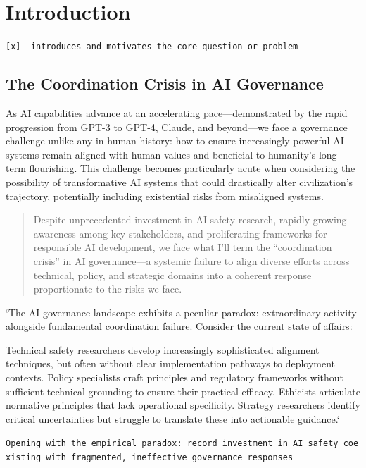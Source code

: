 \documentclass[]{book}
\begin{document}

\chapter{Introduction}\label{sec-introduction}

\texttt{{[}x{]}\ \ introduces\ and\ motivates\ the\ core\ question\ or\ problem}

\section{The Coordination Crisis in AI
Governance}\label{sec-coordination-crisis}

As AI capabilities advance at an accelerating pace---demonstrated by the
rapid progression from GPT-3 to GPT-4, Claude, and beyond---we face a
governance challenge unlike any in human history: how to ensure
increasingly powerful AI systems remain aligned with human values and
beneficial to humanity's long-term flourishing. This challenge becomes
particularly acute when considering the possibility of transformative AI
systems that could drastically alter civilization's trajectory,
potentially including existential risks from misaligned systems.

\begin{quote}
Despite unprecedented investment in AI safety research, rapidly growing
awareness among key stakeholders, and proliferating frameworks for
responsible AI development, we face what I'll term the ``coordination
crisis'' in AI governance---a systemic failure to align diverse efforts
across technical, policy, and strategic domains into a coherent response
proportionate to the risks we face.
\end{quote}

`The AI governance landscape exhibits a peculiar paradox: extraordinary
activity alongside fundamental coordination failure. Consider the
current state of affairs:

Technical safety researchers develop increasingly sophisticated
alignment techniques, but often without clear implementation pathways to
deployment contexts. Policy specialists craft principles and regulatory
frameworks without sufficient technical grounding to ensure their
practical efficacy. Ethicists articulate normative principles that lack
operational specificity. Strategy researchers identify critical
uncertainties but struggle to translate these into actionable guidance.`

\texttt{Opening\ with\ the\ empirical\ paradox:\ record\ investment\ in\ AI\ safety\ coexisting\ with\ fragmented,\ ineffective\ governance\ responses}
\end{document}
